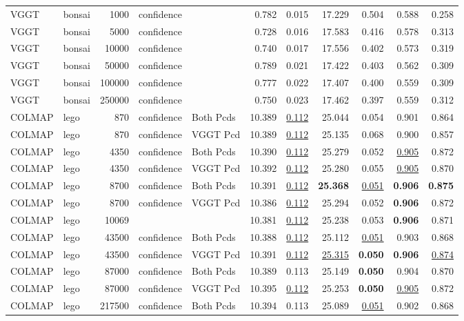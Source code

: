 \begin{table}[H]
\begin{tabular}{llrllrrrrrr}
VGGT & bonsai & 1000 & confidence &  & 0.782 & 0.015 & 17.229 & 0.504 & 0.588 & 0.258 \\
VGGT & bonsai & 5000 & confidence &  & 0.728 & 0.016 & 17.583 & 0.416 & 0.578 & 0.313 \\
VGGT & bonsai & 10000 & confidence &  & 0.740 & 0.017 & 17.556 & 0.402 & 0.573 & 0.319 \\
VGGT & bonsai & 50000 & confidence &  & 0.789 & 0.021 & 17.422 & 0.403 & 0.562 & 0.309 \\
VGGT & bonsai & 100000 & confidence &  & 0.777 & 0.022 & 17.407 & 0.400 & 0.559 & 0.309 \\
VGGT & bonsai & 250000 & confidence &  & 0.750 & 0.023 & 17.462 & 0.397 & 0.559 & 0.312 \\
\midrule
COLMAP & lego & 870 & confidence & Both Pcds & 10.389 & \underline{0.112} & 25.044 & 0.054 & 0.901 & 0.864 \\
COLMAP & lego & 870 & confidence & VGGT Pcd & 10.389 & \underline{0.112} & 25.135 & 0.068 & 0.900 & 0.857 \\
COLMAP & lego & 4350 & confidence & Both Pcds & 10.390 & \underline{0.112} & 25.279 & 0.052 & \underline{0.905} & 0.872 \\
COLMAP & lego & 4350 & confidence & VGGT Pcd & 10.392 & \underline{0.112} & 25.280 & 0.055 & \underline{0.905} & 0.870 \\
COLMAP & lego & 8700 & confidence & Both Pcds & 10.391 & \underline{0.112} & \textbf{25.368} & \underline{0.051} & \textbf{0.906} & \textbf{0.875} \\
COLMAP & lego & 8700 & confidence & VGGT Pcd & 10.386 & \underline{0.112} & 25.294 & 0.052 & \textbf{0.906} & 0.872 \\
COLMAP & lego & 10069 &  &  & 10.381 & \underline{0.112} & 25.238 & 0.053 & \textbf{0.906} & 0.871 \\
COLMAP & lego & 43500 & confidence & Both Pcds & 10.388 & \underline{0.112} & 25.112 & \underline{0.051} & 0.903 & 0.868 \\
COLMAP & lego & 43500 & confidence & VGGT Pcd & 10.391 & \underline{0.112} & \underline{25.315} & \textbf{0.050} & \textbf{0.906} & \underline{0.874} \\
COLMAP & lego & 87000 & confidence & Both Pcds & 10.389 & 0.113 & 25.149 & \textbf{0.050} & 0.904 & 0.870 \\
COLMAP & lego & 87000 & confidence & VGGT Pcd & 10.395 & \underline{0.112} & 25.253 & \textbf{0.050} & \underline{0.905} & 0.872 \\
COLMAP & lego & 217500 & confidence & Both Pcds & 10.394 & 0.113 & 25.089 & \underline{0.051} & 0.902 & 0.868 \\

\end{tabular}
\end{table}
